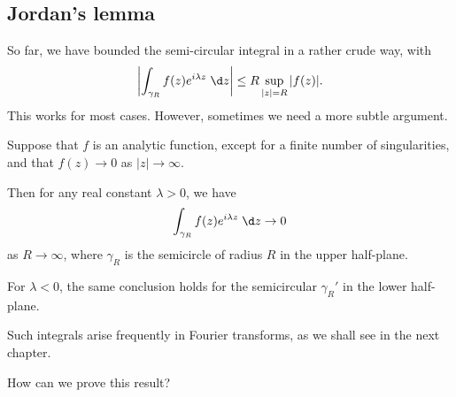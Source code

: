 \documentclass[a4paper]{article}
\begin{document}
\subsection{Jordan's lemma}
So far, we have bounded the semi-circular integral in a rather crude way, with 
\[
  \left|\int_{\gamma_R} f(z) e^{i\lambda z} \;\d z\right| \leq R \sup_{|z| = R} |f(z)|.
\]
This works for most cases. However, sometimes we need a more subtle argument.
\begin{lemma}
  Suppose that $f$ is an analytic function, except for a finite number of singularities, and that $f(z) \to 0$ as $|z| \to \infty$.
  \begin{center}
  \end{center}
  Then for any real constant $\lambda > 0$, we have
  \[
    \int_{\gamma_R} f(z) e^{i\lambda z}\;\d z\to 0
  \]
  as $R \to \infty$, where $\gamma_R$ is the semicircle of radius $R$ in the upper half-plane.

  For $\lambda < 0$, the same conclusion holds for the semicircular $\gamma_R'$ in the lower half-plane.
\end{lemma}
Such integrals arise frequently in Fourier transforms, as we shall see in the next chapter.

How can we prove this result?
\end{document}
